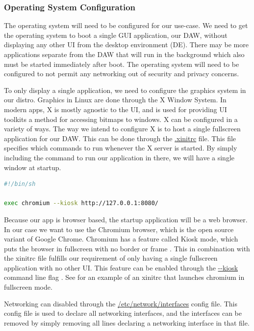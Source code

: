 \subsubsection{Operating System Configuration}
\label{sec:research:subsec:os_config}

The operating system will need to be configured for our use-case. We need to get the
operating system to boot a single GUI application, our DAW, without displaying any other
UI from the desktop environment (DE). There may be more applications separate from the DAW
that will run in the background which also must be started immediately after boot. The
operating system will need to be configured to not permit any networking out of security
and privacy concerns.

To only display a single application, we need to configure the graphics system in our
distro. Graphics in Linux are done through the X Window System. In modern apps, X is
mostly agnostic to the UI, and is used for providing UI toolkits a method for accessing
bitmaps to windows. X can be configured in a variety of ways. The way we intend to
configure X is to host a single fullscreen application for our DAW. This can be done
through the \url{.xinitrc} file. This file specifies which commands to run whenever the X
server is started. By simply including the command to run our application in there, we
will have a single window at startup.

\begin{lstlisting}[language=bash, label={lst:xinitrc}, caption=Example .xinitrc]
#!/bin/sh

exec chromium --kiosk http://127.0.0.1:8080/
\end{lstlisting}

Because our app is browser based, the startup application will be a web browser. In our
case we want to use the Chromium browser, which is the open source variant of Google
Chrome. Chromium has a feature called Kiosk mode, which puts the browser in fullscreen
with no border or frame \autocite{chromiumKioskMode}. This in combination with the xinitrc
file fulfills our requirement of only having a single fullscreen application with no other
UI. This feature can be enabled through the \url{--kiosk} command line flag
\autocite{chromiumKioskMode}. See  for an example of an xinitrc that
launches chromium in fullscreen mode.

Networking can disabled through the \url{/etc/network/interfaces} config file. This config
file is used to declare all networking interfaces, and the interfaces can be removed by
simply removing all lines declaring a networking interface in that file.

